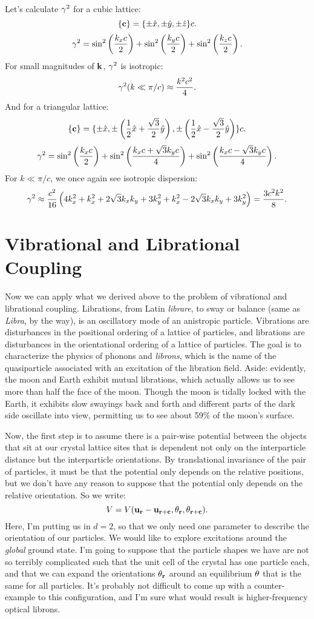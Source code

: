 \documentclass[12pt]{article}
\begin{document}
Let's calculate $\gamma^2$ for a cubic lattice:
\[ \{\mathbf{c}\} = \{\pm \hat x, \pm \hat y,\pm \hat z\} c.\]
\[ \gamma^2 = \sin^2\left(\frac{k_xc}{2}\right) + \sin^2\left(\frac{k_yc}{2}\right)+\sin^2\left(\frac{k_zc}{2}\right).\]
For small magnitudes of $\mathbf{k}$, $\gamma^2$ is isotropic:
\[ \gamma^2(k \ll \pi/c) \approx \frac{k^2c^2}{4}.\]
And for a triangular lattice:
\[ \{\mathbf{c}\} = \{\pm \hat x,\pm \left(\frac{1}{2}\hat x + \frac{\sqrt 3}{2} \hat y\right),\pm \left( \frac{1}{2} \hat x - \frac{\sqrt 3}{2} \hat y\right)\}c.\]
\[ \gamma^2 = \sin^2\left(\frac{k_x c}{2}\right) + \sin^2\left(\frac{k_x c + \sqrt 3 k_y c}{4}\right) + \sin^2 \left(\frac{ k_x c - \sqrt 3 k_y c}{4}\right).\]
For $k \ll \pi/c$, we once again see isotropic dispersion:
\[ \gamma^2 \approx \frac{c^2}{16}\left(4k_x^2 + k_x^2 + 2\sqrt 3 k_x k_y + 3 k_y^2 + k_x^2 - 2\sqrt 3 k_x k_y + 3 k_y^2\right) = \frac{3 c^2 k^2}{8}.\]

\section{Vibrational and Librational Coupling}
Now we can apply what we derived above to the problem of vibrational and librational coupling. Librations, from Latin \emph{librare}, to sway  or balance (same as \emph{Libra}, by the way), is an oscillatory mode of an anistropic particle. Vibrations are disturbances in the positional ordering of a lattice of particles, and librations are disturbances in the orientational ordering of a lattice of particles. The goal is to characterize the physics of phonons and \emph{librons}, which is the name of the quasiparticle associated with an excitation of the libration field. Aside: evidently, the moon and Earth exhibit mutual librations, which actually allows us to see more than half the face of the moon. Though the moon is tidally locked with the Earth, it exhibits slow swayings back and forth and different parts of the dark side oscillate into view, permitting us to see about 59\% of the moon's surface. 


Now, the first step is to assume there is a pair-wise potential between the objects that sit at our crystal lattice sites that is dependent not only on the interparticle distance but the interparticle orientations. By translational invariance of the pair of particles, it must be that the potential only depends on the relative positions, but we don't have any reason to suppose that the potential only depends on the relative orientation. So we write:
\[ V = V(\mathbf{u}_{\mathbf{r}}-\mathbf{u}_{\mathbf{r} + \mathbf{c}},\theta_{\mathbf{r}},\theta_{\mathbf{r}+\mathbf{c}}).\]
Here, I'm putting us in $d=2$, so that we only need one parameter to describe the orientation of our particles. We would like to explore excitations around the \emph{global} ground state. I'm going to suppose that the particle shapes we have are not so terribly complicated such that the unit cell of the crystal has one particle each, and that we can expand the orientations $\theta_{\mathbf{r}}$ around an equilibrium $\theta$ that is the same for all particles. It's probably not difficult to come up with a counter-example to this configuration, and I'm sure what would result is higher-frequency optical librons.
\end{document}
